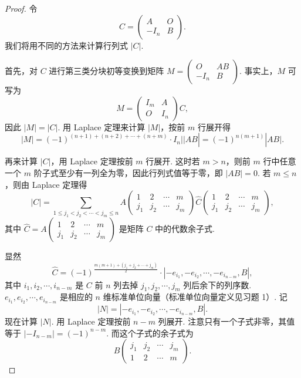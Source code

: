 \begin{proof}
    令
    \[
    C =
    \begin{pmatrix}
    A & O \\
    -I_n & B
    \end{pmatrix}.
    \]
    我们将用不同的方法来计算行列式 $|C|$.

    首先，对 $C$ 进行第三类分块初等变换到矩阵 $M = \begin{pmatrix} O & AB \\ -I_n & B \end{pmatrix}$. 事实上，$M$ 可写为
    \[
    M =
    \begin{pmatrix}
    I_m & A \\
    O & I_n
    \end{pmatrix}
    C,
    \]
    因此 $|M| = |C|$. 用 Laplace 定理来计算 $|M|$，按前 $m$ 行展开得
    \[
    |M| = (-1)^{(n+1)+(n+2)+\cdots+(n+m)} \cdot I_n ||AB| = (-1)^{n(m+1)} |AB|.
    \]

    再来计算 $|C|$，用 Laplace 定理按前 $m$ 行展开. 这时若 $m > n$，则前 $m$ 行中任意一个 $m$ 阶子式至少有一列全为零，因此行列式值等于零，即 $|AB| = 0$. 若 $m \leqslant n$，则由 Laplace 定理得
    \[
    |C| = \sum_{1 \leqslant j_1 < j_2 < \cdots < j_m \leqslant n} A
    \begin{pmatrix}
    1 & 2 & \cdots & m \\
    j_1 & j_2 & \cdots & j_m
    \end{pmatrix}
    \hat{C}
    \begin{pmatrix}
    1 & 2 & \cdots & m \\
    j_1 & j_2 & \cdots & j_m
    \end{pmatrix},
    \]
    其中 $\hat{C} = A \begin{pmatrix} 1 & 2 & \cdots & m \\ j_1 & j_2 & \cdots & j_m \end{pmatrix}$ 是矩阵 $C$ 中的代数余子式.

    显然
    \[
    \hat{C} = (-1)^{\frac{m(m+1) + (j_1 + j_2 + \cdots + j_m)}{2}} \cdot | - e_{i_1}, - e_{i_2}, \cdots, - e_{i_{n-m}}, B |,
    \]
    其中 $i_1, i_2, \cdots, i_{n-m}$ 是 $C$ 前 $n$ 列去掉 $j_1, j_2, \cdots, j_m$ 列后余下的列序数. $e_{i_1}, e_{i_2}, \cdots, e_{i_{n-m}}$ 是相应的 $n$ 维标准单位向量（标准单位向量定义见习题 1）. 记
    \[
    |N| = | - e_{i_1}, - e_{i_2}, \cdots, - e_{i_{n-m}}, B |.
    \]
    现在计算 $|N|$. 用 Laplace 定理按前 $n-m$ 列展开. 注意只有一个子式非零，其值等于 $| - I_{n-m}| = (-1)^{n-m}$. 而这个子式的余子式为
    \[
    B \begin{pmatrix} j_1 & j_2 & \cdots & j_m \\ 1 & 2 & \cdots & m \end{pmatrix}.
    \]


\end{proof}
